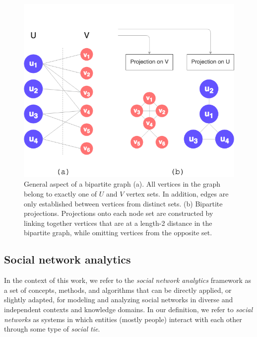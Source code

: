 \begin{figure}[h!]
  	\centering
    \includegraphics[width=0.5\linewidth]{figures/bipartite_general.png}
    \caption[General aspect of bipartite graphs and their projections.]{General aspect of a bipartite graph (a). All vertices in the graph belong to exactly one of $U$ and $V$ vertex sets. In addition, edges are only established between vertices from distinct sets. (b) Bipartite projections. Projections onto each node set are constructed by linking together vertices that are at a length-2 distance in the bipartite graph, while omitting vertices from the opposite set.}
    \label{fig:bipartite_general}
  \end{figure}


\subsection{Social network analytics}
In the context of this work, we refer to the \textit{social network analytics} framework as a set of concepts, methods, and algorithms that can be directly applied, or slightly adapted, for modeling and analyzing social networks in diverse and independent contexts and knowledge domains.
%
In our definition, we refer to \textit{social networks} as systems in which entities (mostly people) interact with each other through some type of \textit{social tie}.

